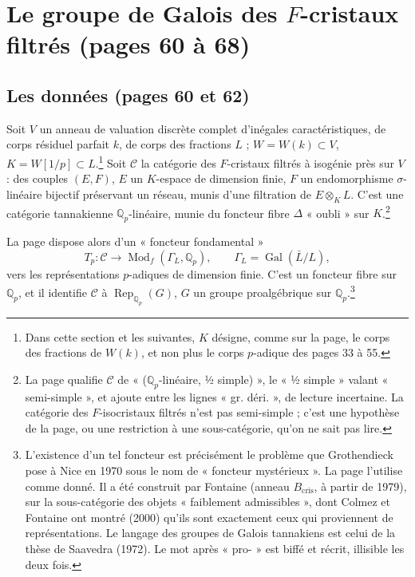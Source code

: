 \documentclass[11pt,a4paper]{article}
\begin{document}
\section*{Le groupe de Galois des $F$-cristaux filtrés (pages 60 à 68)}

\subsection*{Les données (pages 60 et 62)}

Soit $V$ un anneau de valuation discrète complet d'inégales
caractéristiques, de corps résiduel parfait $k$, de corps des fractions $L$ ;
$W = W(k) \subset V$, $K = W[1/p] \subset L$.\footnote{Dans cette section et
les suivantes, $K$ désigne, comme sur la page, le corps des fractions de
$W(k)$, et non plus le corps $p$-adique des pages 33 à 55.} Soit
$\mathscr{C}$ la catégorie des $F$-cristaux filtrés à isogénie près sur $V$ :
des couples $(E, F)$, $E$ un $K$-espace de dimension finie, $F$ un
endomorphisme $\sigma$-linéaire bijectif préservant un réseau, munis d'une
filtration de $E \otimes_{K} L$. C'est une catégorie tannakienne
$\mathbb{Q}_{p}$-linéaire, munie du foncteur fibre $\Delta$ « oubli » sur
$K$.\footnote{La page qualifie $\mathscr{C}$ de « ($\mathbb{Q}_{p}$-linéaire,
½ simple) », le « ½ simple » valant « semi-simple », et ajoute entre les
lignes « gr. déri. », de lecture incertaine. La catégorie des $F$-isocristaux
filtrés n'est pas semi-simple ; c'est une hypothèse de la page, ou une
restriction à une sous-catégorie, qu'on ne sait pas lire.}

La page dispose alors d'un « foncteur fondamental »
\[
T_{p}\colon \mathscr{C} \longrightarrow \operatorname{Mod}_{f}(\Gamma_{L},
\mathbb{Q}_{p}), \qquad \Gamma_{L} = \operatorname{Gal}(\bar L/L),
\]
vers les représentations $p$-adiques de dimension finie. C'est un foncteur
fibre sur $\mathbb{Q}_{p}$, et il identifie $\mathscr{C}$ à
$\operatorname{Rep}_{\mathbb{Q}_{p}}(G)$, $G$ un groupe proalgébrique sur
$\mathbb{Q}_{p}$.\footnote{L'existence d'un tel foncteur est précisément le
problème que Grothendieck pose à Nice en 1970 sous le nom de « foncteur
mystérieux ». La page l'utilise comme donné. Il a été construit par
Fontaine (anneau $B_{\mathrm{cris}}$, à partir de 1979), sur la
sous-catégorie des objets « faiblement admissibles », dont Colmez et Fontaine
ont montré (2000) qu'ils sont exactement ceux qui proviennent de
représentations. Le langage des groupes de Galois tannakiens est celui de la
thèse de Saavedra (1972). Le mot après « pro- » est biffé et récrit,
illisible les deux fois.}
\end{document}

